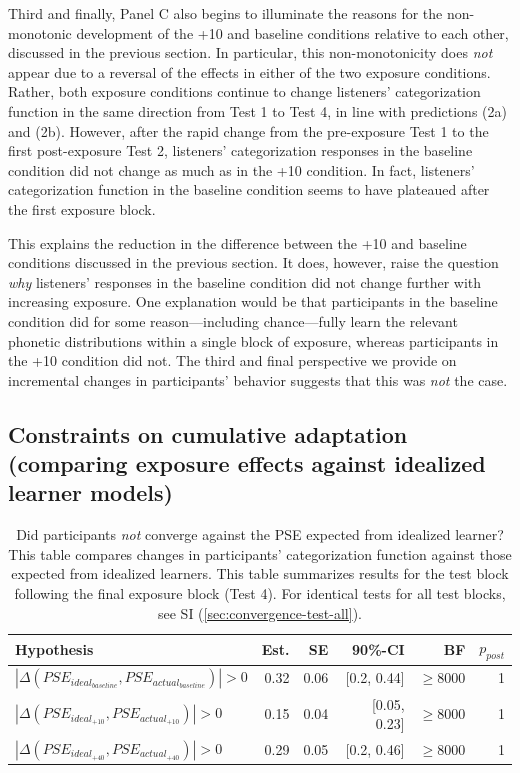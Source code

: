 \documentclass[
  11pt,
  man,mask,floatsintext]{apa6}
\begin{document}
Third and finally, Panel C also begins to illuminate the reasons for the non-monotonic development of the +10 and baseline conditions relative to each other, discussed in the previous section. In particular, this non-monotonicity does \emph{not} appear due to a reversal of the effects in either of the two exposure conditions. Rather, both exposure conditions continue to change listeners' categorization function in the same direction from Test 1 to Test 4, in line with predictions (2a) and (2b). However, after the rapid change from the pre-exposure Test 1 to the first post-exposure Test 2, listeners' categorization responses in the baseline condition did not change as much as in the +10 condition. In fact, listeners' categorization function in the baseline condition seems to have plateaued after the first exposure block.

This explains the reduction in the difference between the +10 and baseline conditions discussed in the previous section. It does, however, raise the question \emph{why} listeners' responses in the baseline condition did not change further with increasing exposure. One explanation would be that participants in the baseline condition did for some reason---including chance---fully learn the relevant phonetic distributions within a single block of exposure, whereas participants in the +10 condition did not. The third and final perspective we provide on incremental changes in participants' behavior suggests that this was \emph{not} the case.

\subsection{Constraints on cumulative adaptation (comparing exposure effects against idealized learner models)}\label{constraints-on-cumulative-adaptation-comparing-exposure-effects-against-idealized-learner-models}

\begin{table}[H]
\centering
\caption{\label{tab:hypothesis-table-convergence-test4-pre-exposure-PSE}Did participants {\em not} converge against the PSE expected from idealized learner? This table compares changes in participants' categorization function against those expected from idealized learners. This table summarizes results for the test block following the final exposure block (Test 4). For identical tests for all test blocks, see SI (\ref{sec:convergence-test-all}).}
\centering
\begin{tabular}[t]{>{\raggedright\arraybackslash}p{22em}rrrrr}
\toprule
Hypothesis & Est. & SE & 90\%-CI & BF & $p_{post}$\\
\midrule
$|\Delta(PSE_{ideal_{baseline}}, PSE_{actual_{baseline}})| > 0$ & 0.32 & 0.06 & {}[0.2, 0.44] & $\geq 8000 $ & 1\\
$|\Delta(PSE_{ideal_{+10}}, PSE_{actual_{+10}})| > 0$ & 0.15 & 0.04 & {}[0.05, 0.23] & $\geq 8000 $ & 1\\
$|\Delta(PSE_{ideal_{+40}}, PSE_{actual_{+40}})| > 0$ & 0.29 & 0.05 & {}[0.2, 0.46] & $\geq 8000 $ & 1\\
\bottomrule
\end{tabular}
\end{table}
\end{document}

